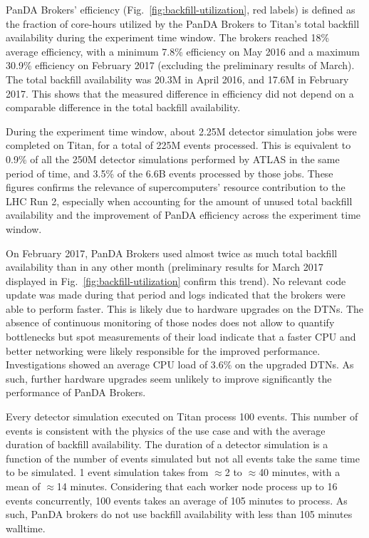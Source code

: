 PanDA Brokers' efficiency (Fig.~\ref{fig:backfill-utilization}, red labels)
is defined as the fraction of core-hours utilized by the PanDA Brokers to
Titan’s total backfill availability during the experiment time window. The
brokers reached 18\% average efficiency, with a minimum 7.8\% efficiency on
May 2016 and a maximum 30.9\% efficiency on February 2017 (excluding the
preliminary results of March). The total backfill availability was 20.3M in
April 2016, and 17.6M in February 2017. This shows that the measured
difference in efficiency did not depend on a comparable difference in the
total backfill availability.

During the experiment time window, about 2.25M detector simulation jobs were
completed on Titan, for a total of 225M events processed. This is equivalent
to 0.9\% of all the 250M detector simulations performed by ATLAS in the same
period of time, and 3.5\% of the 6.6B events processed by those jobs. These
figures confirms the relevance of supercomputers' resource contribution to
the LHC Run 2, especially when accounting for the amount of unused total
backfill availability and the improvement of PanDA efficiency across the
experiment time window.

On February 2017, PanDA Brokers used almost twice as much total backfill
availability than in any other month (preliminary results for March 2017
displayed in Fig.~\ref{fig:backfill-utilization} confirm this trend). No
relevant code update was made during that period and logs indicated that the
brokers were able to perform faster. This is likely due to hardware upgrades
on the DTNs. The absence of continuous monitoring of those nodes does not
allow to quantify bottlenecks but spot measurements of their load indicate
that a faster CPU and better networking were likely responsible for the
improved performance. Investigations showed an average CPU load of 3.6\% on
the upgraded DTNs. As such, further hardware upgrades seem unlikely to
improve significantly the performance of PanDA Brokers.

Every detector simulation executed on Titan process 100 events. This number
of events is consistent with the physics of the use case and with the average
duration of backfill availability. The duration of a detector simulation is a
function of the number of events simulated but not all events take the same
time to be simulated. 1 event simulation takes from $\approx$2 to $\approx$40
minutes, with a mean of $\approx$14 minutes. Considering that each worker
node process up to 16 events concurrently, 100 events takes an average of 105
minutes to process. As such, PanDA brokers do not use backfill availability
with less than 105 minutes walltime.

